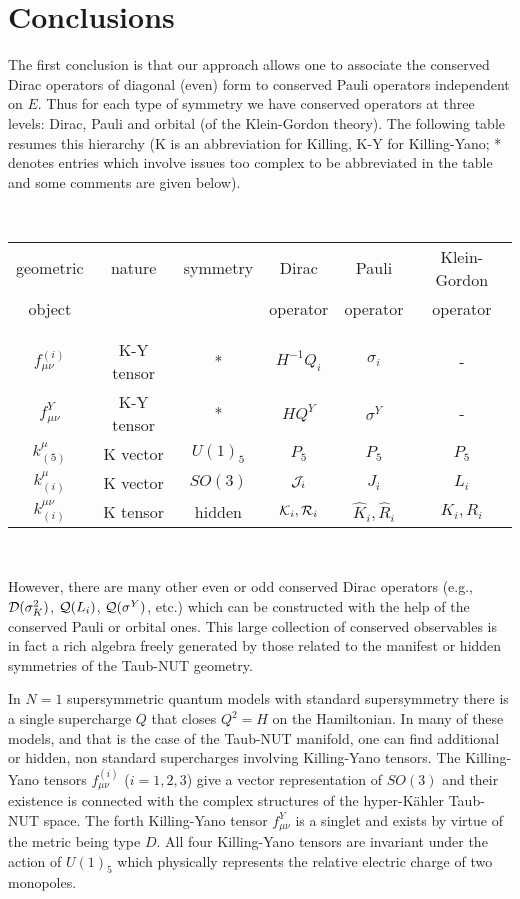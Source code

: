 \documentclass[a4paper,12pt]{article}
\begin{document}
\section{Conclusions}

The first conclusion is that our approach allows one to associate the 
conserved Dirac operators of diagonal (even) form to conserved Pauli 
operators independent on $E$. Thus for each type of symmetry we have 
conserved operators at three levels: Dirac, Pauli and orbital (of the 
Klein-Gordon theory). 
The following table resumes this hierarchy (K is an abbreviation for 
Killing, K-Y for Killing-Yano; * denotes entries which involve issues 
too complex to be abbreviated in the table and some comments are given 
below).

~

\begin{center}
\begin{tabular}{cccccc}
\hline
geometric       &nature   &symmetry&Dirac   &Pauli   &Klein-Gordon\\
object          &         &        &operator&operator&operator\\      
&&&&&\\
\hline
&&&&&\\
$f_{\mu\nu}^{(i)}$&K-Y tensor&*     &$H^{-1}Q_{i}$&$\sigma_{i}$&-\\
$f_{\mu\nu}^{Y}$&K-Y tensor&*      &$HQ^{Y}$&$\sigma^{Y}$&-\\
$k_{(5)}^{\mu}$&K vector&$U(1)_5$&$P_{5}$&$P_{5}$&$P_{5}$\\
$k_{(i)}^{\mu}$&K vector&$SO(3)$&${\cal J}_{i}$&$J_{i}$&$L_{i}$\\
$k_{(i)}^{\mu\nu}$&K tensor& hidden&${\cal K}_{i},{\cal R}_i$
&$\hat{K}_{i},\hat{R}_{i} $&$K_{i},R_i$\\
\hline
\end{tabular}
\end{center}

~

However, there are many other even or odd conserved Dirac operators (e.g., 
${\cal D}(\sigma_{K}^2)$, ${\cal Q}(L_{i})$, ${\cal Q}(\sigma^Y)$, etc.) 
which can be constructed with the help of the conserved Pauli or orbital 
ones. This large collection of conserved observables is in fact a rich 
algebra freely generated by those related to the manifest or hidden 
symmetries of the Taub-NUT geometry.  

In $N=1$ supersymmetric quantum models with standard supersymmetry 
there is a single supercharge $Q$ that closes $Q^2 = H$  on the 
Hamiltonian. In many of these models, and that is the case of the 
Taub-NUT manifold, one can find additional or hidden, non standard 
supercharges involving Killing-Yano tensors. 
The Killing-Yano tensors $f^{(i)}_{\mu\nu}$ ($i=1,2,3$) give a vector 
representation of $SO(3)$ and their existence is connected with the 
complex structures of the hyper-K\"ahler Taub-NUT space. 
The forth Killing-Yano tensor $f^Y_{\mu\nu}$ is a singlet and exists by 
virtue of the metric being type $D$. All four Killing-Yano tensors are 
invariant under the action of $U(1)_5$ which physically represents the 
relative electric charge of two monopoles.
\end{document}
